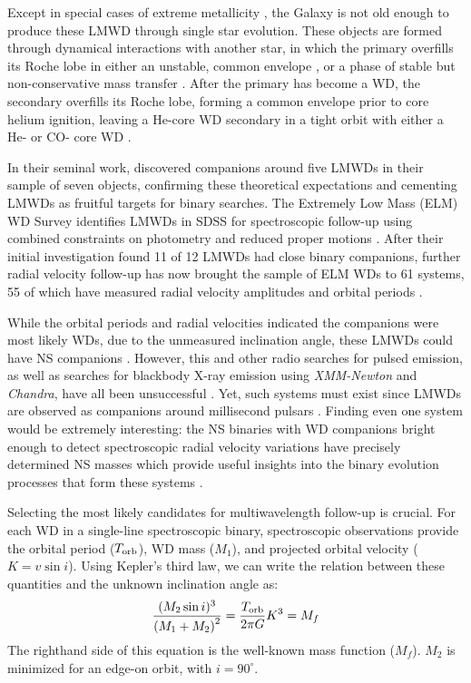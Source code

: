 \documentclass[letterpaper,12pt,preprint]{aastex}
\newcommand{\degree}{^{\circ}}
\newcommand{\period}{T_{\rm orb}}
\newcommand{\mf}{M_f}
\begin{document}
Except in special cases of extreme metallicity \citep{kilic07}, the Galaxy is not old enough to produce these LMWD through single star evolution. These objects are formed through dynamical interactions with another star, in which the primary overfills its Roche lobe in either an unstable, common envelope \citep{vdSluys06}, or a phase of stable but non-conservative mass transfer \citep{woods12}. After the primary has become a WD, the secondary overfills its Roche lobe, forming a common envelope prior to core helium ignition, leaving a He-core WD secondary in a tight orbit with either a He- or CO- core WD \citep{han98}.


In their seminal work, \citet{marsh95} discovered companions around five LMWDs in their sample of seven objects, confirming these theoretical expectations and cementing LMWDs as fruitful targets for binary searches. The Extremely Low Mass (ELM) WD Survey identifies LMWDs in SDSS for spectroscopic follow-up using combined constraints on photometry and reduced proper motions \citep{ELMI}. After their initial investigation found 11 of 12 LMWDs had close binary companions, further radial velocity follow-up has now brought the sample of ELM WDs to 61 systems, 55 of which have measured radial velocity amplitudes and orbital periods \citep{ELMII, ELMIII, ELMIV, ELMV}.


While the orbital periods and radial velocities indicated the companions were most likely WDs, due to the unmeasured inclination angle, these LMWDs could have NS companions \citep{vLeeuwen07}. However, this and other radio searches for pulsed emission, as well as searches for blackbody X-ray emission using {\it XMM-Newton} and {\it Chandra}, have all been unsuccessful \citep{agueros09a,agueros09b,kilic13}. Yet, such systems must exist since LMWDs are observed as companions around millisecond pulsars \citep{vKerkwijk96,callanan98,bassa06,antoniadis12}. Finding even one system would be extremely interesting: the NS binaries with WD companions bright enough to detect spectroscopic radial velocity variations have precisely determined NS masses which provide useful insights into the binary evolution processes that form these systems . 


Selecting the most likely candidates for multiwavelength follow-up is crucial. For each WD in a single-line spectroscopic binary, spectroscopic observations provide the orbital period ($\period$), WD mass ($M_1$), and projected orbital velocity ($K=v \sin i$). Using Kepler's third law, we can write the relation between these quantities and the unknown inclination angle as:
\begin{equation}
	\frac{(M_2 \sin i)^3}{\left(M_1+M_2\right)^2} = \frac{\period}{2\pi G} K^3 = \mf \label{eq:massfunc}
\end{equation}
The righthand side of this equation is the well-known mass function ($\mf$). $M_2$ is minimized for an edge-on orbit, with $i = 90\degree$. 
\end{document}
